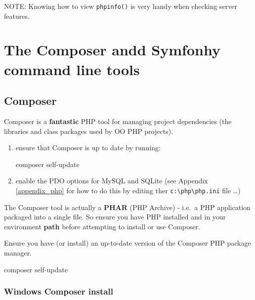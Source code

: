 \documentclass[a4paperpaper,openright]{book}
\newenvironment{Shaded}{}{}
\newcommand{\ExtensionTok}[1]{#1}
\newcommand{\NormalTok}[1]{#1}
\begin{document}
NOTE: Knowing how to view \texttt{phpinfo()} is very handy when checking
server features.

\hypertarget{the-composer-andd-symfonhy-command-line-tools}{%
\chapter{\texorpdfstring{The Composer andd Symfonhy command line
tools\label{cli_tools}}{The Composer andd Symfonhy command line tools}}\label{the-composer-andd-symfonhy-command-line-tools}}

\hypertarget{composer}{%
\section{Composer}\label{composer}}

Composer is a \textbf{fantastic} PHP tool for managing project
dependencies (the libraries and class packages used by OO PHP projects).

\begin{enumerate}
\def\labelenumi{\arabic{enumi}.}
\item
  ensure that Composer is up to date by running:

\begin{Shaded}
\begin{Highlighting}[]
    \ExtensionTok{composer}\NormalTok{ self-update}
\end{Highlighting}
\end{Shaded}
\item
  enable the PDO options for MySQL and SQLite (see Appendix
  \ref{appendix_php} for how to do this by editing ther
  \texttt{c:\textbackslash{}php\textbackslash{}php.ini} file \ldots{})
\end{enumerate}

The Composer tool is actually a \textbf{PHAR} (PHP Archive) - i.e.~a PHP
application packaged into a single file. So ensure you have PHP
installed and in your environment \textbf{path} before attempting to
install or use Composer.

Ensure you have (or install) an up-to-date version of the Composer PHP
package manager.

\begin{Shaded}
\begin{Highlighting}[]
    \ExtensionTok{composer}\NormalTok{ self-update}
\end{Highlighting}
\end{Shaded}

\hypertarget{windows-composer-install}{%
\subsection{Windows Composer install}\label{windows-composer-install}}
\end{document}
